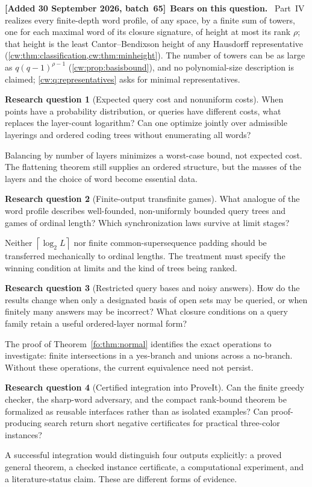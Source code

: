 \documentclass[11pt,letterpaper]{article}
\numberwithin{equation}{section}
\theoremstyle{definition}
\theoremstyle{remark}
\theoremstyle{definition}
\newtheorem{question}{Research question}
\newcommand{\ceil}[1]{\left\lceil#1\right\rceil}
\newenvironment{writenoted}[1][]{\par\smallskip\begingroup\small\sloppy
 \noindent\textbf{[Added 30 September 2026, batch~65]}\if\relax\detokenize{#1}\relax\else~\textbf{#1.}\fi\ }%
 {\par\endgroup\smallskip}
\begin{document}
\begin{writenoted}[Bears on this question]
Part~IV realizes every finite-depth word profile, of any space, by a finite
sum of towers, one for each maximal word of its closure signature, of height
at most its rank $\rho$; that height is the least Cantor--Bendixson height of
any Hausdorff representative (\cref{cw:thm:classification,cw:thm:minheight}).
The number of towers can be as large as $q(q-1)^{\rho-1}$
(\cref{cw:prop:basisbound}), and no polynomial-size description is claimed;
\cref{cw:q:representatives} asks for minimal representatives.
\end{writenoted}

\begin{question}[Expected query cost and nonuniform costs]
When points have a probability distribution, or queries have different costs,
what replaces the layer-count logarithm? Can one optimize jointly over
admissible layerings and ordered coding trees without enumerating all words?
\end{question}
Balancing by number of layers minimizes a worst-case bound, not expected cost.
The flattening theorem still supplies an ordered structure, but the masses of
the layers and the choice of word become essential data.

\begin{question}[Finite-output transfinite games]
What analogue of the word profile describes well-founded, non-uniformly bounded
query trees and games of ordinal length? Which synchronization laws survive at
limit stages?
\end{question}
Neither $\ceil{\log_2 L}$ nor finite common-supersequence padding should be
transferred mechanically to ordinal lengths. The treatment must specify the
winning condition at limits and the kind of trees being ranked.

\begin{question}[Restricted query bases and noisy answers]
How do the results change when only a designated basis of open sets may be
queried, or when finitely many answers may be incorrect? What closure conditions
on a query family retain a useful ordered-layer normal form?
\end{question}
The proof of Theorem~\ref{fo:thm:normal} identifies the exact operations to
investigate: finite intersections in a yes-branch and unions across a no-branch.
Without these operations, the current equivalence need not persist.

\begin{question}[Certified integration into ProveIt]
Can the finite greedy checker, the sharp-word adversary, and the compact
rank-bound theorem be formalized as reusable interfaces rather than as
isolated examples? Can proof-producing search return short negative
certificates for practical three-color instances?
\end{question}
A successful integration would distinguish four outputs explicitly: a proved
general theorem, a checked instance certificate, a computational experiment,
and a literature-status claim. These are different forms of evidence.
\end{document}
